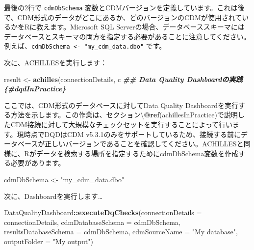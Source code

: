 \documentclass[
  11pt]{book}
\newenvironment{Shaded}{\begin{snugshade}}{\end{snugshade}}
\newcommand{\AttributeTok}[1]{\textcolor[rgb]{0.13,0.29,0.53}{#1}}
\newcommand{\DocumentationTok}[1]{\textcolor[rgb]{0.56,0.35,0.01}{\textbf{\textit{#1}}}}
\newcommand{\FloatTok}[1]{\textcolor[rgb]{0.00,0.00,0.81}{#1}}
\newcommand{\FunctionTok}[1]{\textcolor[rgb]{0.13,0.29,0.53}{\textbf{#1}}}
\newcommand{\NormalTok}[1]{#1}
\newcommand{\OtherTok}[1]{\textcolor[rgb]{0.56,0.35,0.01}{#1}}
\newcommand{\SpecialCharTok}[1]{\textcolor[rgb]{0.81,0.36,0.00}{\textbf{#1}}}
\newcommand{\StringTok}[1]{\textcolor[rgb]{0.31,0.60,0.02}{#1}}
\theoremstyle{definition}
\theoremstyle{definition}
\theoremstyle{definition}
\theoremstyle{definition}
\theoremstyle{remark}
\begin{document}
最後の2行で \texttt{cdmDbSchema} 変数とCDMバージョンを定義しています。これは後で、CDM形式のデータがどこにあるか、どのバージョンのCDMが使用されているかをRに教えます。Microsoft SQL Serverの場合、データベーススキーマにはデータベースとスキーマの両方を指定する必要があることに注意してください。例えば、\texttt{cdmDbSchema\ \textless{}-\ "my\_cdm\_data.dbo"} です。

次に、ACHILLESを実行します：

\begin{Shaded}
\begin{Highlighting}[]
\NormalTok{result }\OtherTok{\textless{}{-}} \FunctionTok{achilles}\NormalTok{(connectionDetails,}
\NormalTok{                   c}
\DocumentationTok{\#\# Data Quality Dashboardの実践 \{\#dqdInPractice\}}

\NormalTok{ここでは、CDM形式のデータベースに対してData Quality Dashboardを実行する方法を示します。この作業は、セクション\textbackslash{}}\SpecialCharTok{@}\FunctionTok{ref}\NormalTok{(achillesInPractice)で説明したCDM接続に対して大規模なチェックセットを実行することによって行います。現時点でDQDはCDM v5.}\FloatTok{3.1}\NormalTok{のみをサポートしているため、接続する前にデータベースが正しいバージョンであることを確認してください。ACHILLESと同様に、Rがデータを検索する場所を指定するために}\StringTok{\textasciigrave{}}\AttributeTok{cdmDbSchema}\StringTok{\textasciigrave{}}\NormalTok{変数を作成する必要があります。}
\end{Highlighting}
\end{Shaded}

\begin{Shaded}
\begin{Highlighting}[]
\NormalTok{cdmDbSchema }\OtherTok{\textless{}{-}} \StringTok{"my\_cdm\_data.dbo"}
\end{Highlighting}
\end{Shaded}

次に、Dashboardを実行します\ldots{}

\begin{Shaded}
\begin{Highlighting}[]
\NormalTok{DataQualityDashboard}\SpecialCharTok{::}\FunctionTok{executeDqChecks}\NormalTok{(}\AttributeTok{connectionDetails =}\NormalTok{ connectionDetails,}
                                      \AttributeTok{cdmDatabaseSchema =}\NormalTok{ cdmDbSchema,}
                                      \AttributeTok{resultsDatabaseSchema =}\NormalTok{ cdmDbSchema,}
                                      \AttributeTok{cdmSourceName =} \StringTok{"My database"}\NormalTok{,}
                                      \AttributeTok{outputFolder =} \StringTok{"My output"}\NormalTok{)}
\end{Highlighting}
\end{Shaded}
\end{document}
